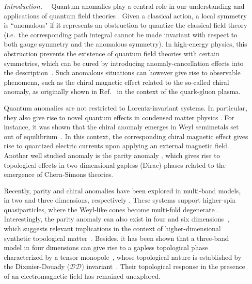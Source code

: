 \documentclass[twocolumn,prl,10pt,superscriptaddress]{revtex4}
\begin{document}
\emph{Introduction.---}
Quantum anomalies play a central role in our understanding and applications of quantum field theories \cite{Bertlmann,Landsteiner}. Given a classical action, a local symmetry is ``anomalous" if it represents an obstruction to quantize the classical field theory (i.e.~the corresponding path integral cannot be made invariant with respect to both gauge symmetry and the anomalous symmetry). In high-energy physics, this obstruction prevents the existence of quantum field theories with certain symmetries, which can be cured by introducing anomaly-cancellation effects into the description~\cite{Montero}.
Such anomalous situations can however give rise to observable phenomena, such as the chiral magnetic effect related to the so-called chiral anomaly, as originally shown in Ref.~\cite{Fukushima} in the context of the quark-gluon plasma.

Quantum anomalies are not restricted to Lorentz-invariant systems. In particular, they also give rise to novel quantum effects in condensed matter physics  \cite{Yamamoto,Chernodub,Parrikar,Fujimoto,Shen,Nissinen,Stone}. For instance, it was shown that the chiral anomaly emerges in Weyl semimetals set out of equilibrium~\cite{Burkov,Grushin,Franz,Pikulin,Grushin4, Armitage}.
In this context, the corresponding chiral magnetic effect gives rise to quantized electric currents upon applying an external magnetic field.
Another well studied anomaly is the parity anomaly \cite{Redlich,Semenoff,Haldane,Witten,Lapa,Hank,Hank2,Kurkov}, which gives rise to topological effects in two-dimensional gapless (Dirac) phases \cite{Zhu2,Hughes} related to the emergence of Chern-Simons theories.

Recently, parity and chiral anomalies have been explored in multi-band models, in two and three dimensions, respectively \cite{Petkou,Burrello,Surowska}. These systems support higher-spin quasiparticles, where the Weyl-like cones become multi-fold degenerate \cite{Bercioux,Lan,Kennett,Wieder,Juricic,Bradlyn,Burrello2,Grushin2,Grushin3,Ezawa2016}.
Interestingly, the parity anomaly can also exist in four and six dimensions~\cite{Moore,Grimm}, which suggests relevant implications in the context of higher-dimensional synthetic topological matter~\cite{Goldman2,Zilberberg,Lee}.
Besides, it has been shown that a three-band model in four dimensions can give rise to a gapless topological phase characterized by a tensor monopole~\cite{Palumbo2018,Palumbo2019}, whose topological nature is established by the Dixmier-Douady ($\mathcal{DD}$) invariant~\cite{Mathai,Murray}. Their topological response in the presence of an electromagnetic field has remained unexplored.
\end{document}

